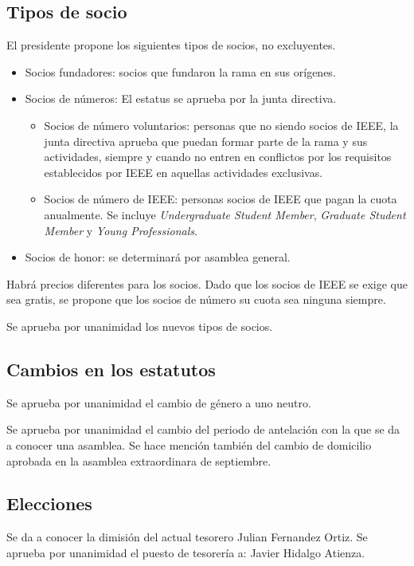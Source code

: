 \documentclass[12pt,twoside,openany,a4paper]{book}
\begin{document}
    \subsection{Tipos de socio}
    El presidente propone los siguientes tipos de socios, no excluyentes.
    \begin{itemize}
        \item Socios fundadores: socios que fundaron la rama en sus orígenes.

        \item Socios de números: El estatus se aprueba por la junta directiva.
            \begin{itemize}
                \item Socios de número voluntarios: personas que no siendo socios de IEEE, la junta directiva aprueba que puedan formar parte de la rama y sus actividades, siempre y cuando no entren en conflictos por los requisitos establecidos por IEEE en aquellas actividades exclusivas.

                \item Socios de número de IEEE: personas socios de IEEE que pagan la cuota anualmente. Se incluye \textit{Undergraduate Student Member}, \textit{Graduate Student Member} y \textit{Young Professionals}.
            \end{itemize}

        \item Socios de honor: se determinará por asamblea general.
    \end{itemize}

    Habrá precios diferentes para los socios. Dado que los socios de IEEE se exige que sea gratis, se propone que los socios de número su cuota sea ninguna siempre.

    Se aprueba por unanimidad los nuevos tipos de socios.

    \subsection{Cambios en los estatutos}
    Se aprueba por unanimidad el cambio de género a uno neutro.

    Se aprueba por unanimidad el cambio del periodo de antelación con la que se da a conocer una asamblea.
    Se hace mención también del cambio de domicilio aprobada en la asamblea extraordinara de septiembre.

    \subsection{Elecciones}
    Se da a conocer la dimisión del actual tesorero Julian Fernandez Ortiz. Se aprueba por unanimidad el puesto de tesorería a: Javier Hidalgo Atienza.
\end{document}
